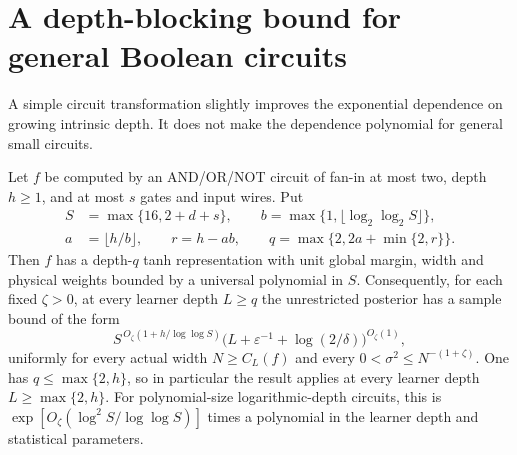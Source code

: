 \section{A depth-blocking bound for general Boolean circuits}
\label{sec:boolean-blocking}

A simple circuit transformation slightly improves the exponential
dependence on growing intrinsic depth. It does not make the dependence
polynomial for general small circuits.

\begin{proposition}
\label{prop:boolean-layer-blocking}
Let $f$ be computed by an AND/OR/NOT circuit of fan-in at most two,
depth $h\ge1$, and at most $s$ gates and input wires. Put
\begin{align*}
 S&=\max\{16,2+d+s\},\qquad
 b=\max\{1,\lfloor\log_2\log_2 S\rfloor\},\\
 a&=\lfloor h/b\rfloor,\qquad r=h-ab,\qquad
 q=\max\{2,2a+\min\{2,r\}\}.
\end{align*}
Then $f$ has a depth-$q$ tanh representation with unit global margin,
width and physical weights bounded by a universal polynomial in $S$.
Consequently, for each fixed $\zeta>0$, at every learner depth $L\ge q$
the unrestricted posterior has a sample bound of the form
\[
 S^{\,O_\zeta(1+h/\log\log S)}
 \bigl(L+\varepsilon^{-1}+\log(2/\delta)\bigr)^{O_\zeta(1)},
\]
uniformly for every actual width $N\ge C_L(f)$ and every
$0<\sigma^2\le N^{-(1+\zeta)}$.
One has $q\le\max\{2,h\}$, so in particular the result applies
at every learner depth $L\ge\max\{2,h\}$.
For polynomial-size logarithmic-depth circuits, this is
$\exp[O_\zeta(\log^2 S/\log\log S)]$ times a polynomial in the
learner depth and statistical parameters.
\end{proposition}

